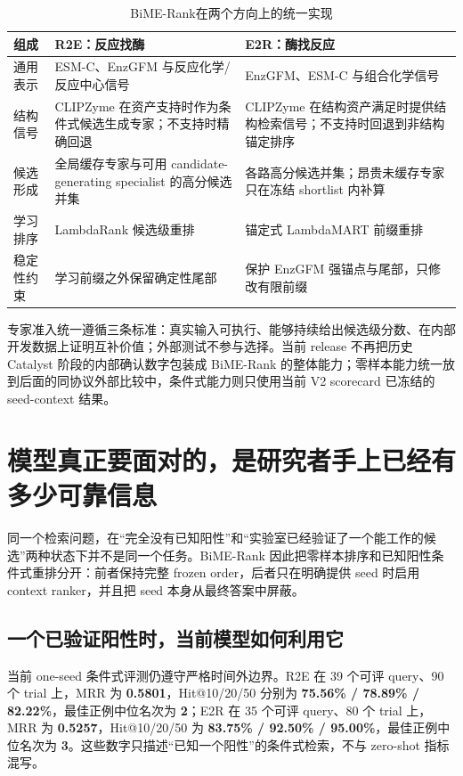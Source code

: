 \documentclass[11pt,a4paper]{ctexart}
\begin{document}
\begin{table}[htbp]
\centering
\caption{BiME-Rank在两个方向上的统一实现}
\begin{tabularx}{\textwidth}{@{}L{31mm}YY@{}}
\toprule
\textbf{组成} & \textbf{R2E：反应找酶} & \textbf{E2R：酶找反应}\\
\midrule
通用表示 & ESM-C、EnzGFM 与反应化学/反应中心信号 & EnzGFM、ESM-C 与组合化学信号\\
结构信号 & CLIPZyme 在资产支持时作为条件式候选生成专家；不支持时精确回退 & CLIPZyme 在结构资产满足时提供结构检索信号；不支持时回退到非结构锚定排序\\
候选形成 & 全局缓存专家与可用 candidate-generating specialist 的高分候选并集 & 各路高分候选并集；昂贵未缓存专家只在冻结 shortlist 内补算\\
学习排序 & LambdaRank 候选级重排 & 锚定式 LambdaMART 前缀重排\\
稳定性约束 & 学习前缀之外保留确定性尾部 & 保护 EnzGFM 强锚点与尾部，只修改有限前缀\\
\bottomrule
\end{tabularx}
\end{table}

专家准入统一遵循三条标准：真实输入可执行、能够持续给出候选级分数、在内部开发数据上证明互补价值；外部测试不参与选择。当前 release 不再把历史 Catalyst 阶段的内部确认数字包装成 BiME-Rank 的整体能力；零样本能力统一放到后面的同协议外部比较中，条件式能力则只使用当前 V2 scorecard 已冻结的 seed-context 结果。

\section{模型真正要面对的，是研究者手上已经有多少可靠信息}

同一个检索问题，在“完全没有已知阳性”和“实验室已经验证了一个能工作的候选”两种状态下并不是同一个任务。BiME-Rank 因此把零样本排序和已知阳性条件式重排分开：前者保持完整 frozen order，后者只在明确提供 seed 时启用 context ranker，并且把 seed 本身从最终答案中屏蔽。

\subsection{一个已验证阳性时，当前模型如何利用它}

当前 one-seed 条件式评测仍遵守严格时间外边界。R2E 在 39 个可评 query、90 个 trial 上，MRR 为 \textbf{0.5801}，Hit@10/20/50 分别为 \textbf{75.56\% / 78.89\% / 82.22\%}，最佳正例中位名次为 \textbf{2}；E2R 在 35 个可评 query、80 个 trial 上，MRR 为 \textbf{0.5257}，Hit@10/20/50 为 \textbf{83.75\% / 92.50\% / 95.00\%}，最佳正例中位名次为 \textbf{3}。这些数字只描述“已知一个阳性”的条件式检索，不与 zero-shot 指标混写。
\end{document}
